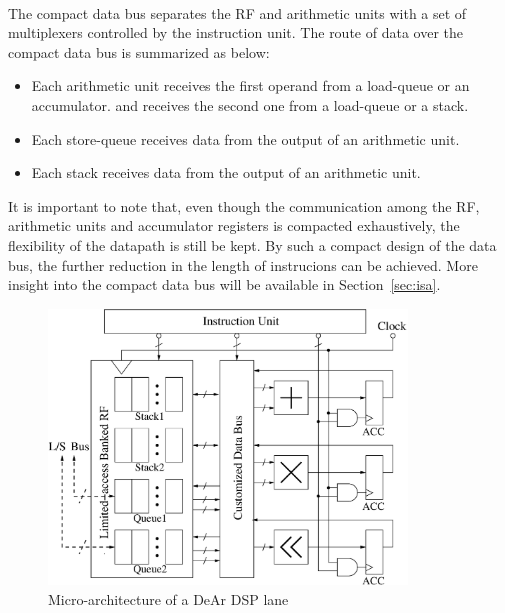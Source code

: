 \\\indent
The compact data bus separates the RF and arithmetic units with a set of multiplexers controlled by the instruction unit.
The route of data over the compact data bus is summarized as below:
\begin{itemize}
    \item Each arithmetic unit receives the first operand from a load-queue or an accumulator.
        and receives the second one from a load-queue or a stack.
    \item Each store-queue receives data from the output of an arithmetic unit.
    \item Each stack receives data from the output of an arithmetic unit.
\end{itemize}
It is important to note that, even though the communication among the RF, arithmetic units and accumulator registers is compacted exhaustively, 
the flexibility of the datapath is still be kept.
By such a compact design of the data bus, the further reduction in the length of instrucions can be achieved.
More insight into the compact data bus will be available in Section~\ref{sec:isa}.

\vspace{\textfig}
\begin{figure}[!ht] 
    \centering
    \includegraphics[width=0.85\textwidth]{./figs/micro.eps}
    \caption{Micro-architecture of a DeAr DSP lane}
    \label{fig:micro}
\end{figure}


